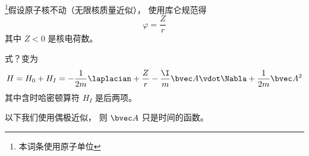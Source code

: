 
\begin{issues}
\issueDraft
\end{issues}


\footnote{本词条使用原子单位}假设原子核不动（无限核质量近似）， 使用库仑规范得
\begin{equation}
\varphi = \frac{Z}{r}
\end{equation}
其中 $Z < 0$ 是核电荷数。

式？变为
\begin{equation}
H = H_0 + H_I = -\frac{1}{2m} \laplacian +  \frac{Z}{r} - \frac{\I}{m} \bvec A \vdot \Nabla + \frac{1}{2m} \bvec A^2
\end{equation}
其中含时哈密顿算符 $H_I$ 是后两项。

以下我们使用偶极近似， 则 $\bvec A$ 只是时间的函数。
